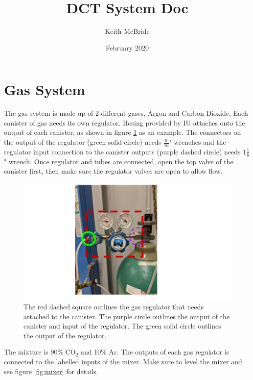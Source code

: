 \documentclass[12pt]{article}
\title{DCT System Doc}
\author{Keith McBride}
\date{February 2020}
\begin{document}
\maketitle

\section{Gas System}
The gas system is made up of 2 different gases, Argon and Carbon Dioxide. Each canister of gas needs its own regulator. Hosing provided by IU attaches onto the output of each canister, as shown in figure \ref{fig:canister} as an example. The connectors on the output of the regulator (green solid circle) needs $\frac{9}{16}$" wrenches and the regulator input connection to the canister outputs (purple dashed circle) needs $1\frac{1}{8}$" wrench. Once regulator and tubes are connected, open the top valve of the canister first, then make sure the regulator valves are open to allow flow. 

\begin{figure}
  \hspace{-1in}
  \includegraphics[scale=0.4]{DCT_gas_canister_example.png}
  \caption{The red dashed square outlines the gas regulator that needs attached to the canister. The purple circle outlines the output of the canister and input of the regulator. The green solid circle outlines the output of the regulator.}
  \label{fig:canister}
\end{figure}

The mixture is 90\% CO$_{2}$ and 10\% Ar. The outputs of each gas regulator is connected to the labelled inputs of the mixer. Make sure to level the mixer and see figure \ref{fig:mixer} for details.
\end{document}
